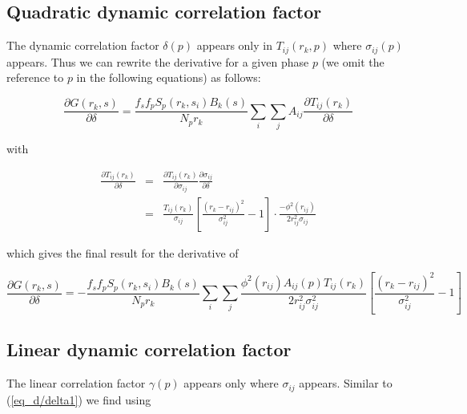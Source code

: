 \subsection*{Quadratic dynamic correlation factor}

The dynamic correlation factor $\delta(p)$ appears only in $T_{ij}
(r_{k},p)$ where $\sigma_{ij}(p)$ appears. Thus we can rewrite the
derivative for a given phase $p$ (we omit the reference to $p$ in
the following equations) as follows:

\begin{equation}
  \frac{\partial G(r_{k},s)}{\partial \delta} =
    \frac{f_{s}f_{p} S_{p}(r_{k},s_{i}) B_{k}(s)}{N_{p}r_{k}} \sum_{i} \sum_{j}
    A_{ij} \frac{\partial T_{ij}(r_{k})}{\partial \delta}
  \label{eq_d/delta1}
\end{equation}

\noindent
with

\begin{eqnarray}
  \frac{\partial T_{ij}(r_{k})}{\partial \delta} & = &
    \frac{\partial T_{ij}(r_{k})}{\partial \sigma_{ij}}
    \frac{\partial \sigma_{ij}} {\partial \delta} \nonumber \\
  & = & \frac{T_{ij}(r_{k})}{\sigma_{ij}}
    \left [\frac{(r_{k} - r_{ij})^{2}}{\sigma_{ij}^{2}} - 1 \right ]\cdot
    \frac{- \phi^{2}(r_{ij})}{2 r_{ij}^{2} \sigma_{ij}}
  \label{eq_d/delta2}
\end{eqnarray}

\noindent
which gives the final result for the derivative of

\begin{equation}
  \frac{\partial G(r_{k},s)}{\partial \delta} =
    - \frac{f_{s}f_{p} S_{p}(r_{k},s_{i}) B_{k}(s)}{N_{p}r_{k}} \sum_{i} \sum_{j}
      \frac{\phi^{2}(r_{ij})A_{ij}(p)T_{ij}(r_{k})}{2 r_{ij}^{2} \sigma^{2}_{ij}}
      \left [ \frac{(r_{k} - r_{ij})^{2}}{\sigma_{ij}^{2}} - 1
      \right ]
  \label{eq_d/delta3}
\end{equation}


\subsection*{Linear dynamic correlation factor}

The linear correlation factor $\gamma(p)$ appears only where
$\sigma_{ij}$ appears. Similar to (\ref{eq_d/delta1}) we find
using

